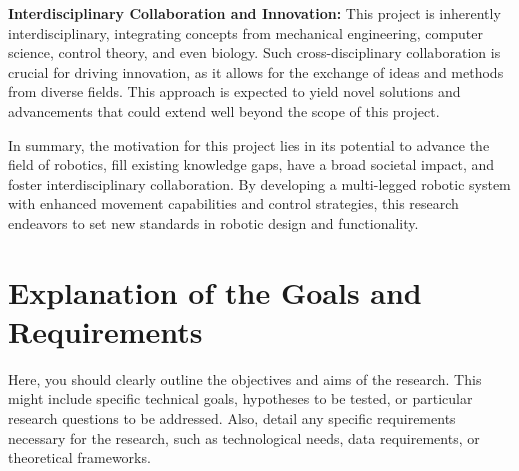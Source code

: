 \textbf{Interdisciplinary Collaboration and Innovation:} This project is inherently interdisciplinary, integrating concepts from mechanical engineering, computer science, control theory, and even biology. Such cross-disciplinary collaboration is crucial for driving innovation, as it allows for the exchange of ideas and methods from diverse fields. This approach is expected to yield novel solutions and advancements that could extend well beyond the scope of this project.

In summary, the motivation for this project lies in its potential to advance the field of robotics, fill existing knowledge gaps, have a broad societal impact, and foster interdisciplinary collaboration. By developing a multi-legged robotic system with enhanced movement capabilities and control strategies, this research endeavors to set new standards in robotic design and functionality.

\section{Explanation of the Goals and Requirements}
Here, you should clearly outline the objectives and aims of the research. This might include specific technical goals, hypotheses to be tested, or particular research questions to be addressed. Also, detail any specific requirements necessary for the research, such as technological needs, data requirements, or theoretical frameworks.


